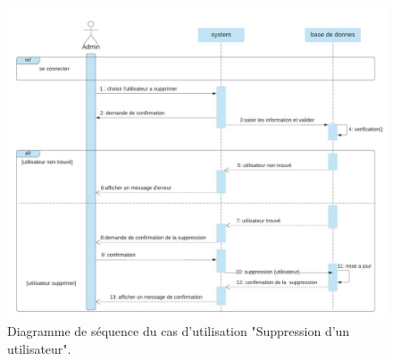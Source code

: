 \documentclass[french]{report}
\begin{document}
        \begin{figure}[H]
            \centering
            \includegraphics[width=1\textwidth]{images/sequence diag supp user.jpg}
            \caption{Diagramme de séquence du cas d'utilisation "Suppression d'un utilisateur".}
            \label{fig:my_label}
        \end{figure}
        
\end{document}
